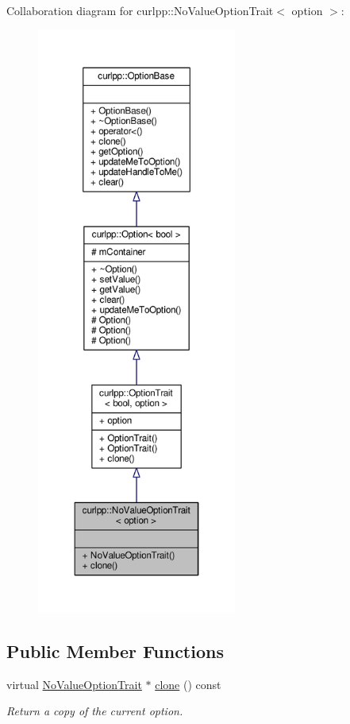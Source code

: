 Collaboration diagram for curlpp\-:\-:No\-Value\-Option\-Trait$<$ option $>$\-:\nopagebreak
\begin{figure}[H]
\begin{center}
\leavevmode
\includegraphics[height=550pt]{classcurlpp_1_1NoValueOptionTrait__coll__graph}
\end{center}
\end{figure}
\subsection*{Public Member Functions}
\begin{DoxyCompactItemize}
\item 
virtual \hyperlink{classcurlpp_1_1NoValueOptionTrait}{No\-Value\-Option\-Trait} $\ast$ \hyperlink{classcurlpp_1_1NoValueOptionTrait_af1e088d6a56673c18eaebe13b87fa743}{clone} () const 
\begin{DoxyCompactList}\small\item\em Return a copy of the current option. \end{DoxyCompactList}\end{DoxyCompactItemize}

